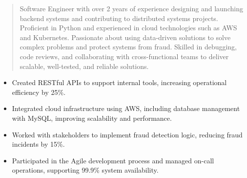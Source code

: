



\makecvheader

\begin{quote}
  \noindent
  Software Engineer with over 2 years of experience designing and launching backend systems and contributing to distributed systems projects. Proficient in Python and experienced in cloud technologies such as AWS and Kubernetes. Passionate about using data-driven solutions to solve complex problems and protect systems from fraud. Skilled in debugging, code reviews, and collaborating with cross-functional teams to deliver scalable, well-tested, and reliable solutions.
\end{quote}

\par\smallskip
\noindent
\begin{minipage}{20cm}
  \begin{minipage}{9.75cm}
    \begin{itemize}
      \item Created RESTful APIs to support internal tools, increasing operational efficiency by 25\%.
      \item Integrated cloud infrastructure using AWS, including database management with MySQL, improving scalability and performance.
    \end{itemize}
  \end{minipage}
  \hfill
  \begin{minipage}{9.75cm}
    \begin{itemize}
      \item Worked with stakeholders to implement fraud detection logic, reducing fraud incidents by 15\%.
      \item Participated in the Agile development process and managed on-call operations, supporting 99.9\% system availability.
    \end{itemize}
  \end{minipage}
\end{minipage}
\par\smallskip
\divider

